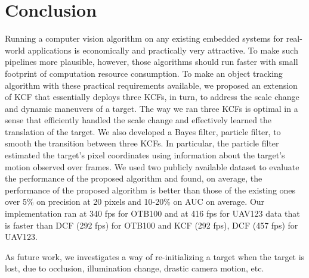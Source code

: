 \documentclass{bmvc2k}
\begin{document}
\section{Conclusion} \label{sc:Conclusion}
Running a computer vision algorithm on any existing embedded systems
for real-world applications is economically and practically very
attractive. To make such pipelines more plausible, however, those
algorithms should run faster with small footprint of computation
resource consumption. To make an object tracking algorithm with these
practical requirements available, we proposed an extension of KCF that
essentially deploys three KCFs, in turn, to address the scale change
and dynamic maneuvers of a target. The way we ran three KCFs is
optimal in a sense that efficiently handled the scale change and
effectively learned the translation of the target. We also developed a
Bayes filter, particle filter, to smooth the transition between three
KCFs. In particular, the particle filter estimated the target's pixel
coordinates using information about the target's motion observed over
frames. We used two publicly available dataset to evaluate the
performance of the proposed algorithm and found, on average, the
performance of the proposed algorithm is better than those of the
existing ones over 5\% on precision at 20 pixels and 10-20\% on AUC on
average. Our implementation ran at 340 fps for OTB100 and at 416 fps
for UAV123 data that is faster than DCF (292 fps) for OTB100 and KCF
(292 fps), DCF (457 fps) for UAV123.

As future work, we investigates a way of re-initializing a target when
the target is lost, due to occlusion, illumination change, drastic
camera motion, etc.


\end{document}
